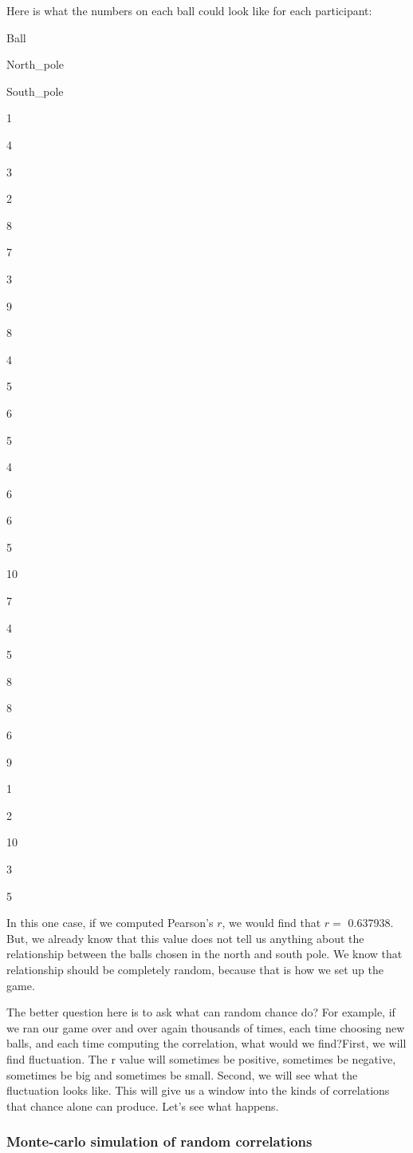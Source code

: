 \documentclass[]{book}
\begin{document}
Here is what the numbers on each ball could look like for each participant:

Ball

North\_pole

South\_pole

1

4

3

2

8

7

3

9

8

4

5

6

5

4

6

6

5

10

7

4

5

8

8

6

9

1

2

10

3

5

In this one case, if we computed Pearson's \(r\), we would find that \(r =\) 0.637938. But, we already know that this value does not tell us anything about the relationship between the balls chosen in the north and south pole. We know that relationship should be completely random, because that is how we set up the game.

The better question here is to ask what can random chance do? For example, if we ran our game over and over again thousands of times, each time choosing new balls, and each time computing the correlation, what would we find?First, we will find fluctuation. The r value will sometimes be positive, sometimes be negative, sometimes be big and sometimes be small. Second, we will see what the fluctuation looks like. This will give us a window into the kinds of correlations that chance alone can produce. Let's see what happens.

\hypertarget{monte-carlo-simulation-of-random-correlations}{%
\subsubsection{Monte-carlo simulation of random correlations}\label{monte-carlo-simulation-of-random-correlations}}
\end{document}
